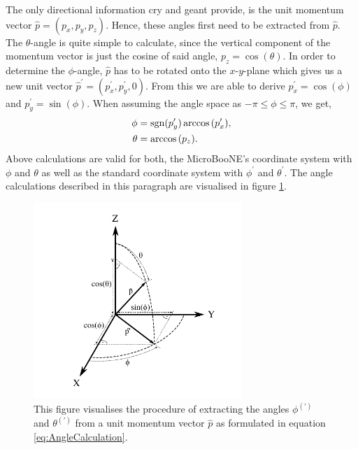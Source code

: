 The only directional information \gls{cry} and \gls{geant} provide, is the unit momentum vector $\hat{p} = (p_x,p_y,p_z)$. Hence, these angles first need to be extracted from $\hat{p}$. The $\theta$-angle is quite simple to calculate, since the vertical component of the momentum vector is just the cosine of said angle, $p_z = \cos{(\theta)}$. In order to determine the $\phi$-angle, $\hat{p}$ has to be rotated onto the $x$-$y$-plane which gives us a new unit vector $\hat{p}^{\prime} = (p_{x}^{\prime},p_{y}^{\prime},0)$. From this we are able to derive $p_{x}^{\prime} = \cos{(\phi)}$ and $p_{y}^{\prime} = \sin{(\phi)}$. When assuming the angle space as $-\pi \leq \phi \leq \pi$, we get,
\begin{align} \label{eq:AngleCalculation}
        \phi &= \operatorname{sgn} (p_{y}^{\prime}) \arccos{(p_{x}^{\prime})}, \nonumber \\
        \theta &= \arccos{\left(p_z\right)}.
\end{align}
Above calculations are valid for both, the MicroBooNE's coordinate system with $\phi$ and $\theta$ as well as the standard coordinate system with $\phi^\prime$ and $\theta^\prime$. The angle calculations described in this paragraph are visualised in figure \ref{fig:AngleCalculation}.
\begin{figure}[htbp]
    \centering
    \includegraphics[width=0.7\textwidth]{images/CosmicGammaBackground/AngleCalculation.pdf}
    \caption[Angle Calculation from a Unit Momentum Vector]{This figure visualises the procedure of extracting the angles $\phi^{(\prime)}$ and $\theta^{(\prime)}$ from a unit momentum vector $\hat{p}$ as formulated in equation \ref{eq:AngleCalculation}.}
    \label{fig:AngleCalculation}
\end{figure}

